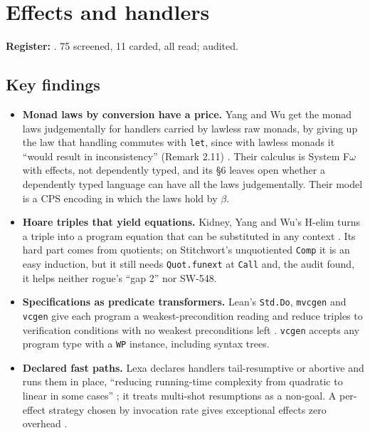 \documentclass[11pt,a4paper]{article}
\newcommand{\code}[1]{\texttt{#1}}
\newcommand{\file}[1]{\path{#1}}
\begin{document}
\section{Effects and handlers}\label{sec:effects}

\textbf{Register:} \file{docs/research/effects.md}. 75 screened, 11 carded, all read; audited.

\subsection{Key findings}
\begin{itemize}
  \item \textbf{Monad laws by conversion have a price.} Yang and Wu get the monad laws
    judgementally for handlers carried by lawless raw monads, by giving up the law that
    handling commutes with \code{let}, since with lawless monads it ``would result in
    inconsistency'' (Remark 2.11) \cite{yang2026judgemental}. Their calculus is System F$\omega$
    with effects, not dependently typed, and its \S6 leaves open whether a dependently typed
    language can have all the laws judgementally. Their model is a CPS encoding in which the
    laws hold by $\beta$.
  \item \textbf{Hoare triples that yield equations.} Kidney, Yang and Wu's H-elim turns a
    triple into a program equation that can be substituted in any context
    \cite{kidney2024hoare}. Its hard part comes from quotients; on Stitchwort's unquotiented
    \code{Comp} it is an easy induction, but it still needs \code{Quot.funext} at \code{Call}
    and, the audit found, it helps neither rogue's ``gap 2'' nor SW-548.
  \item \textbf{Specifications as predicate transformers.} Lean's \code{Std.Do},
    \code{mvcgen} and \code{vcgen} give each program a weakest-precondition reading and reduce
    triples to verification conditions with no weakest preconditions left
    \cite{lean2026mvcgen}. \code{vcgen} accepts any program type with a \code{WP} instance,
    including syntax trees.
  \item \textbf{Declared fast paths.} Lexa declares handlers tail-resumptive or abortive and
    runs them in place, ``reducing running-time complexity from quadratic to linear in some
    cases'' \cite{ma2024lexa}; it treats multi-shot resumptions as a non-goal. A per-effect
    strategy chosen by invocation rate gives exceptional effects zero overhead
    \cite{ma2025zero}.

\end{itemize}
\end{document}
